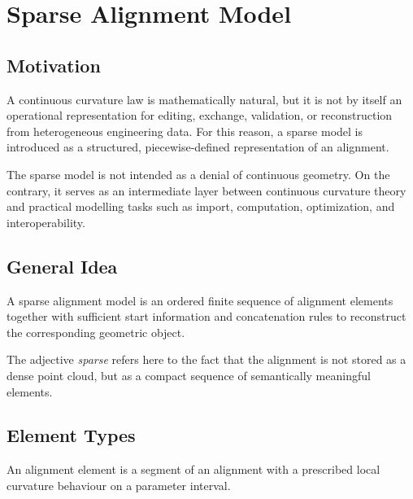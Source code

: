 \chapter{Sparse Alignment Model}

\section{Motivation}

\begin{remark}
A continuous curvature law is mathematically natural, but it is not by
itself an operational representation for editing, exchange, validation,
or reconstruction from heterogeneous engineering data.
For this reason, a sparse model is introduced as a structured,
piecewise-defined representation of an alignment.
\end{remark}

\begin{remark}
The sparse model is not intended as a denial of continuous geometry.
On the contrary, it serves as an intermediate layer between continuous
curvature theory and practical modelling tasks such as import,
computation, optimization, and interoperability.
\end{remark}

\section{General Idea}

\begin{definition}
A sparse alignment model is an ordered finite sequence of alignment
elements together with sufficient start information and concatenation
rules to reconstruct the corresponding geometric object.
\end{definition}

\begin{remark}
The adjective \emph{sparse} refers here to the fact that the alignment
is not stored as a dense point cloud, but as a compact sequence of
semantically meaningful elements.
\end{remark}

\section{Element Types}

\begin{definition}
An alignment element is a segment of an alignment with a prescribed
local curvature behaviour on a parameter interval.
\end{definition}

